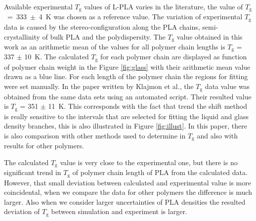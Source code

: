 Available experimental $T_\mathrm{g}$ values of L-PLA varies in the literature, the value  of $T_\mathrm{g}$~=~333~$\pm$~4~K \cite{pyda_reversing_2005} was chosen as a reference value. The variation of experimental $T_\mathrm{g}$ data is caused by the stereo-configuration along the PLA chains, semi-crystallinity of bulk PLA and the polydispersity. \cite{klajmon_glass_2023} The $T_\mathrm{g}$ value obtained in this work as an arithmetic mean of the values for all polymer chain lengths  is $T_\mathrm{g}$ = 337 $\pm$ 10~K. The calculated $T_\mathrm{g}$ for each polymer chain are displayed as function of polymer chain weight in the Figure \ref{fig:glass} with their arithmetic mean value drawn as a blue line. For each length of the polymer chain the regions for fitting were set manually. 
\newpage
In the paper written by Klajmon et al.\cite{klajmon_glass_2023}, the $T_\mathrm{g}$ data value was obtained from the same data sets using an automated script. Their resulted value is $T_\mathrm{g}$ = 351 $\pm$ 11~K. This corresponds with the fact that trend the shift method is really sensitive to the intervals that are selected for fitting the liquid and glass density branches, this is also illustrated in Figure \ref{fig:illust}. In this paper, there is also comparison with other methods used to determine in $T_\mathrm{g}$ and also with results for other polymers. 

The calculated $T_\mathrm{g}$ value is very close to the experimental one, but there is no significant trend in $T_\mathrm{g}$ of polymer chain length of PLA from the calculated data. However, that small deviation between calculated and experimental value is more coincidental, when we compare the data for other polymers the difference is much larger. Also when we consider larger uncertainties of PLA densities the resulted deviation of $T_\mathrm{g}$ between simulation and experiment is larger. \cite{klajmon_glass_2023}


